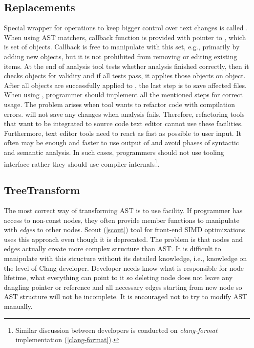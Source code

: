 \subsection{Replacements}
Special wrapper for  operations to keep bigger control over text changes is called . When using AST matchers, callback function is provided with pointer to , which is set of  objects. Callback is free to manipulate with this set, e.g., primarily by adding new objects, but it is not prohibited from removing or editing existing items. At the end of analysis tool tests whether analysis finished correctly, then it checks  objects for validity and if all tests pass, it applies those objects on  object. After all objects are successfully applied to , the last step is to save affected files. When using , programmer should implement all the mentioned steps for correct usage. The problem arises when tool wants to refactor code with compilation errors.  will not save any changes when analysis fails. Therefore, refactoring tools that want to be integrated to source code text editor cannot use these facilities. Furthermore, text editor tools need to react as fast as possible to user input. It often may be enough and faster to use output of  and avoid phases of syntactic and semantic analysis. In such cases, programmers should not use tooling interface rather they should use compiler internals\footnote{Similar discussion between developers is conducted on \emph{clang-format} implementation (\ref{clang-format}).}.

\subsection{TreeTransform}
The most correct way of transforming AST is to use  facility. If programmer has access to non-const nodes, they often provide member functions to manipulate with \textit{edges} to other nodes. Scout (\ref{scout}) tool for front-end SIMD optimizations uses this approach even though it is deprecated. The problem is that nodes and edges actually create more complex structure than AST. It is difficult to manipulate with this structure without its detailed knowledge, i.e., knowledge on the level of Clang developer. Developer needs know what is responsible for node lifetime, what everything can point to it so deleting node does not leave any dangling pointer or reference and all necessary edges starting from new node so AST structure will not be incomplete. It is encouraged not to try to modify AST manually.

